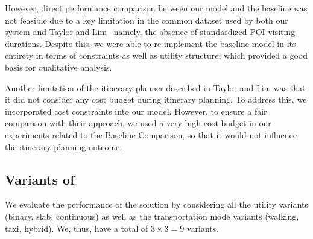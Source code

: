 However, direct performance comparison between our model and the baseline was not feasible due to a key limitation in the common dataset used by both our system and Taylor and Lim \cite{taylor2018tour} --namely, the absence of standardized POI visiting durations. Despite this, we were able to re-implement the baseline model in its entirety in terms of constraints as well as utility structure, which provided a good basis for qualitative analysis. 

Another limitation of the itinerary planner described in Taylor and Lim \cite{taylor2018tour} was that it did not consider any cost budget during itinerary planning. To address this, we incorporated cost constraints into our model. However, to ensure a fair comparison with their approach, we used a very high cost budget in our experiments related to the Baseline Comparison, so that it would not influence the itinerary planning outcome.
\subsection{Variants of \trip}

We evaluate the performance of the \trip solution by considering all the utility variants (binary, slab, continuous) as well as the transportation mode variants (walking, taxi, hybrid). We, thus, have a total of $3 \times 3 = 9$ \trip variants.


